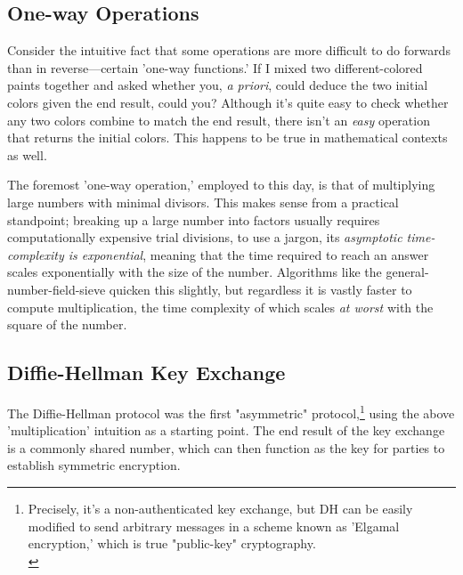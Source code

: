 \documentclass[11pt, a4paper]{report}
\begin{document}

\subsection{One-way Operations}

Consider the intuitive fact that some operations are more difficult to do forwards than in reverse—certain 'one-way functions.' If I mixed two different-colored paints together and asked whether you, \textit{a priori}, could deduce the two initial colors given the end result, could you? Although it's quite easy to check whether any two colors combine to match the end result, there isn't an \textit{easy} operation that returns the initial colors. This happens to be true in mathematical contexts as well. 

The foremost 'one-way operation,' employed to this day, is that of multiplying large numbers with minimal divisors. This makes sense from a practical standpoint; breaking up a large number into factors usually requires computationally expensive trial divisions, to use a jargon, its \textit{asymptotic time-complexity is exponential}, meaning that the time required to reach an answer scales exponentially with the size of the number. Algorithms like the general-number-field-sieve quicken this slightly,\autocite[1482]{pomerance} but regardless it is vastly faster to compute multiplication, the time complexity of which scales \textit{at worst} with the square of the number.\autocite{bunimov}

\subsection{Diffie-Hellman Key Exchange}

The Diffie-Hellman protocol was the first "asymmetric" protocol,\footnote{Precisely, it's a non-authenticated key exchange, but DH can be easily modified to send arbitrary messages in a scheme known as 'Elgamal encryption,' which is true "public-key" cryptography.\\\autocite{elgamal}} using the above 'multiplication' intuition as a starting point. The end result of the key exchange is a commonly shared number, which can then function as the key for parties to establish symmetric encryption.
\end{document}
